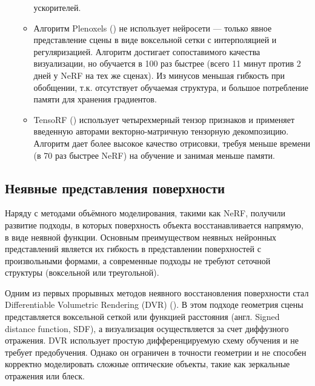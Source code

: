 \begin{itemize}
\begin{itemize}
		ускорителей.
		\item Алгоритм Plenoxels (\cite{yu2021plenoxelsradiancefieldsneural}) не использует
		нейросети — только явное представление сцены в виде воксельной сетки с
		интерполяцией и регуляризацией. Алгоритм достигает сопоставимого качества
		визуализации, но обучается в 100 раз быстрее (всего 11 минут против 2 дней у
		NeRF на тех же сценах). Из минусов меньшая гибкость при обобщении, т.к.
		отсутствует обучаемая структура, и большое потребление памяти для
		хранения градиентов.
		\item TensoRF (\cite{chen2022tensorftensorialradiancefields}) использует
		четырехмерный тензор признаков и применяет введенную авторами
		векторно-матричную тензорную декомпозицию. Алгоритм дает более высокое качество отрисовки,
		требуя меньше времени (в 70 раз быстрее NeRF) на обучение и занимая меньше памяти.
	\end{itemize}
\end{itemize}

\subsection{Неявные представления поверхности}

Наряду с методами объёмного моделирования, такими как NeRF, получили развитие
подходы, в которых поверхность объекта восстанавливается напрямую, в виде
неявной функции. Основным преимуществом неявных нейронных представлений является
их гибкость в представлении поверхностей с произвольными формами,
а современные подходы не требуют сеточной структуры (воксельной или треугольной).

Одним из первых прорывных методов неявного восстановления поверхности стал
Differentiable Volumetric Rendering (DVR)
(\cite{niemeyer2020differentiablevolumetricrenderinglearning}). В этом подходе
геометрия сцены представляется воксельной сеткой или функцией расстояния (англ.
Signed distance function, SDF), а визуализация осуществляется за счет диффузного
отражения. DVR использует простую дифференцируемую схему обучения и не требует
предобучения.  Однако он ограничен в точности геометрии и не способен корректно
моделировать сложные оптические объекты, такие как зеркальные отражения или блеск.

